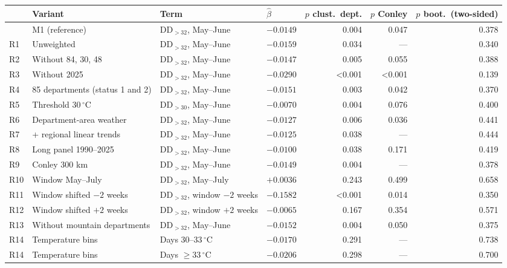 \begin{tabular}{llllrrr}
\toprule
& Variant & Term & $\hat\beta$ & $p$ clust.\ dept. & $p$ Conley & $p$ boot.\ (two-sided) \\
\midrule
 & M1 (reference) & DD$_{>32}$, May--June & $-0.0149$ & 0.004 & 0.047 & 0.378 \\
R1 & Unweighted & DD$_{>32}$, May--June & $-0.0159$ & 0.034 & --- & 0.340 \\
R2 & Without 84, 30, 48 & DD$_{>32}$, May--June & $-0.0147$ & 0.005 & 0.055 & 0.388 \\
R3 & Without 2025 & DD$_{>32}$, May--June & $-0.0290$ & <0.001 & <0.001 & 0.139 \\
R4 & 85 departments (status 1 and 2) & DD$_{>32}$, May--June & $-0.0151$ & 0.003 & 0.042 & 0.370 \\
R5 & Threshold 30\,$^{\circ}$C & DD$_{>30}$, May--June & $-0.0070$ & 0.004 & 0.076 & 0.400 \\
R6 & Department-area weather & DD$_{>32}$, May--June & $-0.0127$ & 0.006 & 0.036 & 0.441 \\
R7 & + regional linear trends & DD$_{>32}$, May--June & $-0.0125$ & 0.038 & --- & 0.444 \\
R8 & Long panel 1990--2025 & DD$_{>32}$, May--June & $-0.0100$ & 0.038 & 0.171 & 0.419 \\
R9 & Conley 300 km & DD$_{>32}$, May--June & $-0.0149$ & 0.004 & --- & 0.378 \\
R10 & Window May--July & DD$_{>32}$, May--July & $+0.0036$ & 0.243 & 0.499 & 0.658 \\
R11 & Window shifted $-2$ weeks & DD$_{>32}$, window $-2$ weeks & $-0.1582$ & <0.001 & 0.014 & 0.350 \\
R12 & Window shifted $+2$ weeks & DD$_{>32}$, window $+2$ weeks & $-0.0065$ & 0.167 & 0.354 & 0.571 \\
R13 & Without mountain departments & DD$_{>32}$, May--June & $-0.0152$ & 0.004 & 0.050 & 0.375 \\
R14 & Temperature bins & Days 30--33\,$^{\circ}$C & $-0.0170$ & 0.291 & --- & 0.738 \\
R14 & Temperature bins & Days $\geq 33$\,$^{\circ}$C & $-0.0206$ & 0.298 & --- & 0.700 \\
\bottomrule
\end{tabular}

